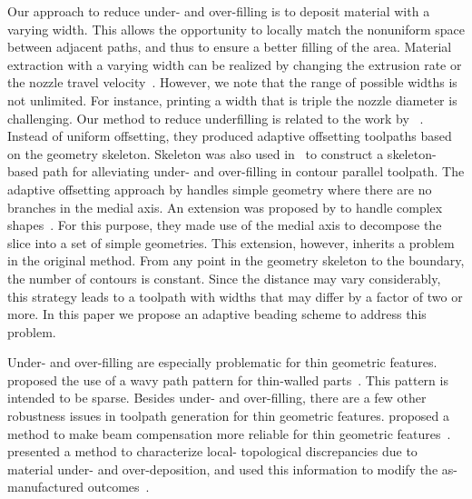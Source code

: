 Our approach to reduce under- and over-filling is to deposit material with a varying width.
This allows the opportunity to locally match the nonuniform space between adjacent paths, and thus to ensure a better filling of the area.
Material extraction with a varying width can be realized by changing the extrusion rate or the nozzle travel velocity~\cite{Ertay2018,Kuipers2018}.
However, we note that the range of possible widths is not unlimited.
For instance, printing a width that is triple the nozzle diameter is challenging.
Our method to reduce underfilling is related to the work by \citeauthor{kao1998optimal}~\cite{kao1998optimal}.
Instead of uniform offsetting, they produced adaptive offsetting toolpaths based on the geometry skeleton. 
Skeleton was also used in~\cite{Jin2017RCIM} to construct a skeleton-based path for alleviating under- and over-filling in contour parallel toolpath. 
The adaptive offsetting approach by \citeauthor{kao1998optimal} handles simple geometry where there are no branches in the medial axis.
An extension was proposed by \citeauthor{Ding2016a} to handle complex shapes~\cite{Ding2016a}.
For this purpose, they made use of the medial axis to decompose the slice into a set of simple geometries.
This extension, however, inherits a problem in the original method.
From any point in the geometry skeleton to the boundary, the number of contours is constant.
Since the distance may vary considerably, this strategy leads to a toolpath with widths that may differ by a factor of two or more.
In this paper we propose an adaptive beading scheme to address this problem. 

Under- and over-filling are especially problematic for thin geometric features.
\citeauthor{Jin2017a} proposed the use of a wavy path pattern for thin-walled parts~\cite{Jin2017a}. 
This pattern is intended to be sparse. 
Besides under- and over-filling, there are a few other robustness issues in toolpath generation for thin geometric features.
\citeauthor{Moesen2011} proposed a method to make beam compensation more reliable for thin geometric features~\cite{Moesen2011}.
\citeauthor{Behandish2019a} presented a method to characterize local- topological discrepancies due to material under- and over-deposition, and used this information to modify the as-manufactured outcomes~\cite{Behandish2019a}. 




